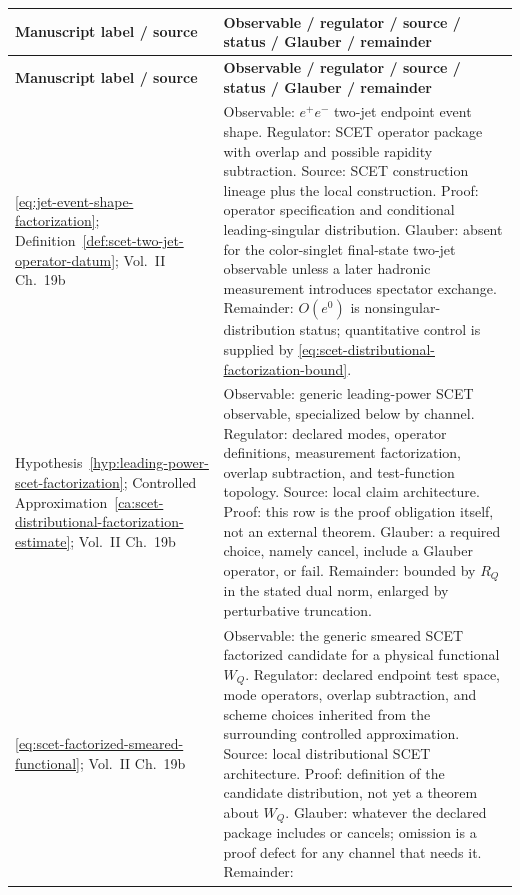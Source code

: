 {\footnotesize
\setlength{\tabcolsep}{4pt}
\begin{longtable}{@{}>{\raggedright\arraybackslash}p{}>{\raggedright\arraybackslash}p{}@{}}
\hline
\textbf{Manuscript label / source} &
\textbf{Observable / regulator / source / status / Glauber / remainder}
\\ \hline
\endfirsthead
\hline
\textbf{Manuscript label / source} &
\textbf{Observable / regulator / source / status / Glauber / remainder}
\\ \hline
\endhead
\eqref{eq:jet-event-shape-factorization};
Definition~\ref{def:scet-two-jet-operator-datum};
Vol.~II Ch.~19b &
Observable: \(e^+e^-\) two-jet endpoint event shape.  Regulator: SCET
operator package with overlap and possible rapidity subtraction.  Source:
SCET construction lineage
\cite{BauerFlemingLuke2000SCET,BauerFlemingPirjolStewart2001SCET} plus the
local construction.  Proof: operator specification and conditional
leading-singular distribution.  Glauber: absent for the color-singlet
final-state two-jet observable
unless a later hadronic measurement introduces spectator exchange.  Remainder:
\(O(e^0)\) is nonsingular-distribution status; quantitative control is
supplied by \eqref{eq:scet-distributional-factorization-bound}.
\\ \hline
Hypothesis~\ref{hyp:leading-power-scet-factorization};
Controlled Approximation~\ref{ca:scet-distributional-factorization-estimate};
Vol.~II Ch.~19b &
Observable: generic leading-power SCET observable, specialized below by
channel.  Regulator: declared modes, operator definitions, measurement
factorization, overlap subtraction, and test-function topology.  Source: local
claim architecture.  Proof: this row is the proof obligation itself, not an
external theorem.  Glauber: a required choice, namely cancel, include a
Glauber operator, or fail.  Remainder: bounded by \(R_Q\) in the stated dual
norm, enlarged by perturbative truncation.
\\ \hline
\eqref{eq:scet-factorized-smeared-functional};
Vol.~II Ch.~19b &
Observable: the generic smeared SCET factorized candidate for a physical
functional \(W_Q\).  Regulator: declared endpoint test space, mode
operators, overlap subtraction, and scheme choices inherited from the
surrounding controlled approximation.  Source: local distributional SCET
architecture.  Proof: definition of the candidate distribution, not yet a
theorem about \(W_Q\).  Glauber: whatever the declared package includes or
cancels; omission is a proof defect for any channel that needs it.  Remainder:

\end{longtable}}
